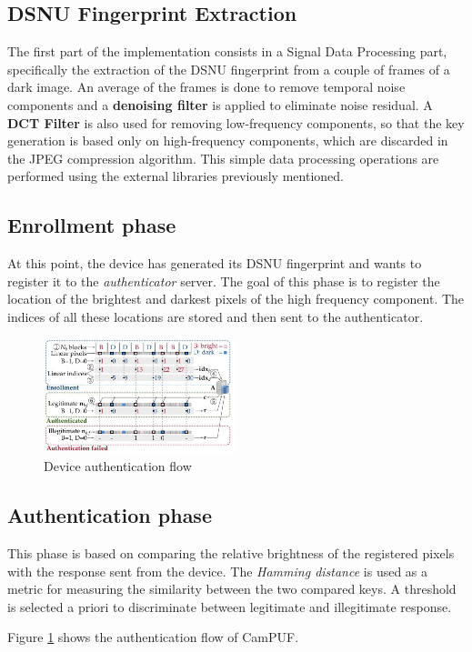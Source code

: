 \subsection{DSNU Fingerprint Extraction}
The first part of the implementation consists in a Signal Data Processing part, specifically the extraction of the DSNU fingerprint from a couple of frames of a dark image. 
An average of the frames is done to remove temporal noise components and a \textbf{denoising filter} is applied to eliminate noise residual.
A \textbf{DCT Filter} is also used for removing low-frequency components, so that the key generation is based only on high-frequency components, which are discarded in the JPEG compression algorithm.
This simple data processing operations are performed using the external libraries previously mentioned.

\subsection{Enrollment phase}
At this point, the device has generated its DSNU fingerprint and wants to register it to the \textit{authenticator} server.
The goal of this phase is to register the location of the brightest and darkest pixels of the high frequency component. The indices of all these locations are stored
and then sent to the authenticator.
\begin{figure}[h!]    
    \centering
    \includegraphics[width=0.5\textwidth]{images/device_auth_flow.jpg}
    \caption{Device authentication flow}
    \label{fig:authflow}
\end{figure}
\subsection{Authentication phase}
This phase is based on comparing the relative brightness of the registered pixels with the response sent from the device. The \textit{Hamming distance} is used as a
metric for measuring the similarity between the two compared keys. A threshold is selected a priori to discriminate between legitimate and illegitimate response.

Figure \ref{fig:authflow} shows the authentication flow of CamPUF.
